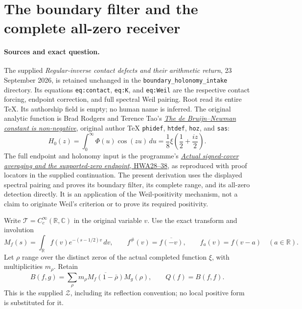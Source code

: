 \section{The boundary filter and the complete all-zero receiver}
\label{sec:boundary-primitive-all-zero}

\paragraph{Sources and exact question.}
The supplied \emph{Regular-inverse contact defects and their arithmetic
return}, 23 September 2026, is retained unchanged in the
\texttt{boundary\_holonomy\_intake} directory. Its equations
\texttt{eq:contact}, \texttt{eq:K}, and \texttt{eq:Weil} are the respective
contact forcing, endpoint correction, and full spectral Weil pairing.
Root read its entire TeX. Its authorship field is empty; no human name
is inferred. The original analytic function is Brad Rodgers and
Terence Tao's
\href{https://arxiv.org/abs/1801.05914v5}{\emph{The de Bruijn--Newman
constant is non-negative}}, original author TeX
\texttt{phidef}, \texttt{htdef}, \texttt{hoz}, and \texttt{sas}:
\[
 H_0(z)=\int_0^\infty\Phi(u)\cos(zu)\,du
 =\frac18\xi\left(\frac12+\frac{iz}{2}\right).
\]
The full endpoint and holonomy input is the programme's
\href{https://github.com/KokunoYumeto/zeta-function-research-reader/blob/569ffbdc3308aeee9db7dc72cfa6d21918736967/workbenches/splitzero-tandem/branches/tau-zero-prime-positivity/HOLONOMY_AVERAGING_WEIL_ENDPOINT_DERIVATION.md}{\emph{Actual
signed-cover averaging and the supported-zero endpoint}, HWA28--38},
as reproduced with proof locators in the supplied continuation.
The present derivation uses the displayed spectral pairing and proves
its boundary filter, its complete range, and its all-zero detection
directly. It is an application of the Weil-positivity mechanism, not a
claim to originate Weil's criterion or to prove its required positivity.

Write $\mathcal T=C_c^\infty(\mathbb R,\mathbb C)$ in the original
variable $v$. Use the exact transform and involution
\begin{equation}\tag{BPZ1}
 M_f(s)=\int_{\mathbb R}f(v)e^{-(s-1/2)v}\,dv,
 \qquad f^\#(v)=\overline{f(-v)},\qquad
 f_a(v)=f(v-a)\quad(a\in\mathbb R).
\end{equation}
Let $\rho$ range over the distinct zeros of the actual completed
function $\xi$, with multiplicities $m_\rho$. Retain
\begin{equation}\tag{BPZ2}
 B(f,g)=\sum_\rho m_\rho
       \overline{M_f(1-\bar\rho)}M_g(\rho),\qquad Q(f)=B(f,f).
\end{equation}
This is the supplied $\mathcal Z$, including its reflection convention;
no local positive form is substituted for it.

